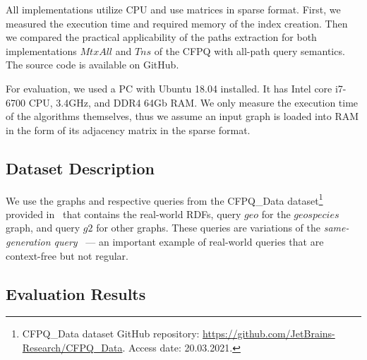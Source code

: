All implementations utilize CPU and use matrices in sparse format. First, we measured the execution time and required memory of the index creation. Then we compared the practical applicability of the paths extraction for both implementations $MtxAll$ and $Tns$ of the CFPQ with all-path query semantics. The source code is available on GitHub.%

For evaluation, we used a PC with Ubuntu 18.04 installed.
It has Intel core i7-6700 CPU, 3.4GHz, and DDR4 64Gb RAM.
We only measure the execution time of the algorithms themselves, thus we assume an input graph is loaded into RAM in the form of its adjacency matrix in the sparse format.

\subsection{Dataset Description}

We use the graphs and respective queries from the CFPQ\_Data dataset\footnote{CFPQ\_Data dataset GitHub repository: \url{https://github.com/JetBrains-Research/CFPQ_Data}. Access date: 20.03.2021.} provided in~\cite{10.1145/3398682.3399163} that contains the real-world RDFs, query $geo$ for the $geospecies$ graph, and query $g2$ for other graphs. These queries are variations of the \textit{same-generation query}~\cite{FndDB} --- an important example of real-world queries that are context-free but not regular.




\subsection{Evaluation Results}


